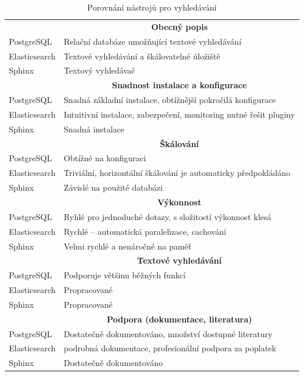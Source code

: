 \documentclass[FM,DP]{tulthesis}
\begin{document}
\begin{table}[h!]
\captionsetup{singlelinecheck=false,justification=raggedright}
\caption{Porovnání nástrojů pro vyhledávání}
\label{search-comp}
\centering
\begin{tabular}{ll}  
\toprule
&\multicolumn{1}{c}{\textbf{Obecný popis}} \\
\cmidrule(r){2-2}
PostgreSQL    & Relační databáze umožňující textové vyhledávání \\
Elasticsearch & Textové vyhledávání a škálovatelné úložiště \\
Sphinx        & Textový vyhledávač \\
\midrule
\midrule
&\multicolumn{1}{c}{\textbf{Snadnost instalace a konfigurace}} \\
\cmidrule(r){2-2}
PostgreSQL    & Snadná základní instalace, obtížnější pokročilá konfigurace \\
Elasticsearch & Intuitivní instalace, zabezpečení, monitoring nutné řešit pluginy \\
Sphinx        & Snadná instalace \\
\midrule
\midrule
&\multicolumn{1}{c}{\textbf{Škálování}} \\
\cmidrule(r){2-2}
PostgreSQL    & Obtížné na konfiguraci \\
Elasticsearch & Triviální, horizontální škálování je automaticky předpokládáno \\
Sphinx        & Závislé na použité databázi \\
\midrule
\midrule
&\multicolumn{1}{c}{\textbf{Výkonnost}} \\
\cmidrule(r){2-2}
PostgreSQL    & Ryhlé pro jednoduché dotazy, s složitostí výkonnost klesá \\
Elasticsearch & Rychlé -- automatická paralelizace, cachování \\
Sphinx        & Velmi rychlé a nenáročné na paměť\\
\midrule
\midrule
&\multicolumn{1}{c}{\textbf{Textové vyhledávání}} \\
\cmidrule(r){2-2}
PostgreSQL    & Podporuje většinu běžných funkcí \\
Elasticsearch & Propracované \\
Sphinx        & Propracované \\
\midrule
\midrule
&\multicolumn{1}{c}{\textbf{Podpora (dokumentace, literatura)}} \\
\cmidrule(r){2-2}
PostgreSQL    & Dostatečně dokumentováno, množství dostupné literatury \\
Elasticsearch & podrobná dokumentace, profesionální podpora za poplatek \\
Sphinx        & Dostatečně dokumentováno \\
\bottomrule
\end{tabular}
\end{table}
\end{document}
